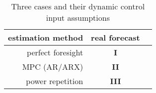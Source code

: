 \begin{table}\centering
	\begin{tabular}{r | c c}
		estimation method & real forecast\\%
		\hline
		perfect foresight & \textbf{I}\\%
		MPC (AR/ARX) & \textbf{II}\\%
		power repetition & \textbf{III}\\%
	\end{tabular}
	\caption{Three cases and their dynamic control input assumptions}
	\label{ch2:tab:cases}	
\end{table}